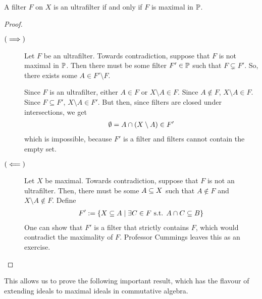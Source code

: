 \begin{boxlemma}\label{Ch2:Lemma:Filter_ultrafilter_iff_maxl}
    A filter $F$ on $X$ is an ultrafilter if and only if $F$ is maximal in $\P$.
\end{boxlemma}
\begin{proof}\hfill
    \begin{description}
        \item[$\parenth{\implies}$] 
        Let $F$ be an ultrafilter. Towards contradiction, suppose that $F$ is not maximal in $\P$. Then there must be some filter $F' \in \P$  such that $F \subsetneq F'$. So, there exists some $A \in F' \setminus F$.

        Since $F$ is an ultrafilter, either $A \in F$ or $X \setminus A \in F$. Since $A \notin F$, $X \setminus A \in F$. Since $F \subseteq F'$, $X \setminus A \in F'$. But then, since filters are closed under intersections, we get
        \begin{align*}
            \emptyset = A \cap \parenth{X \setminus A} \in F'
        \end{align*}
        which is impossible, because $F'$ is a filter and filters cannot contain the empty set.

        \item[$\parenth{\impliedby}$]
        Let $X$ be maximal. Towards contradiction, suppose that $F$ is not an ultrafilter. Then, there must be some $A \ssq X$ such that $A \notin F$ and $X \setminus A \notin F$. Define
        \begin{align*}
            F' := \setst{X \ssq A}{\exists C \in F \st A \cap C \ssq B}
        \end{align*}
        One can show that $F'$ is a filter that strictly contains $F$, which would contradict the maximality of $F$. Professor Cummings leaves this as an exercise.
    \end{description}
\end{proof}

This allows us to prove the following important result, which has the flavour of extending ideals to maximal ideals in commutative algebra.

